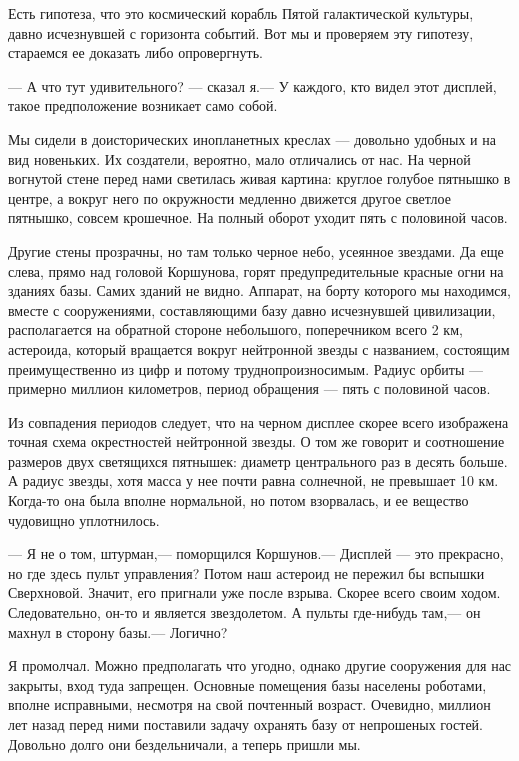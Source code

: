 \documentclass[11pt,a4paper,oneside]{article}
\begin{document}
Есть гипотеза, что это космический корабль Пятой галактической культуры, давно исчезнувшей с горизонта событий. Вот мы и проверяем эту гипотезу, стараемся ее доказать либо опровергнуть.

— А что тут удивительного? — сказал я.— У каждого, кто видел этот дисплей, такое предположение возникает само собой.

Мы сидели в доисторических инопланетных креслах — довольно удобных и на вид новеньких. Их создатели, вероятно, мало отличались от нас. На черной вогнутой стене перед нами светилась живая картина: круглое голубое пятнышко в центре, а вокруг него по окружности медленно движется другое светлое пятнышко, совсем крошечное. На полный оборот уходит пять с половиной часов.

Другие стены прозрачны, но там только черное небо, усеянное звездами. Да еще слева, прямо над головой Коршунова, горят предупредительные красные огни на зданиях базы. Самих зданий не видно. Аппарат, на борту которого мы находимся, вместе с сооружениями, составляющими базу давно исчезнувшей цивилизации, располагается на обратной стороне небольшого, поперечником всего 2 км, астероида, который вращается вокруг нейтронной звезды с названием, состоящим преимущественно из цифр и потому труднопроизносимым. Радиус орбиты — примерно миллион километров, период обращения — пять с половиной часов.

Из совпадения периодов следует, что на черном дисплее скорее всего изображена точная схема окрестностей нейтронной звезды. О том же говорит и соотношение размеров двух светящихся пятнышек: диаметр центрального раз в десять больше. А радиус звезды, хотя масса у нее почти равна солнечной, не превышает 10 км. Когда-то она была вполне нормальной, но потом взорвалась, и ее вещество чудовищно уплотнилось.

— Я не о том, штурман,— поморщился Коршунов.— Дисплей — это прекрасно, но где здесь пульт управления? Потом наш астероид не пережил бы вспышки Сверхновой. Значит, его пригнали уже после взрыва. Скорее всего своим ходом. Следовательно, он-то и является звездолетом. А пульты где-нибудь там,— он махнул в сторону базы.— Логично?

Я промолчал. Можно предполагать что угодно, однако другие сооружения для нас закрыты, вход туда запрещен. Основные помещения базы населены роботами, вполне исправными, несмотря на свой почтенный возраст. Очевидно, миллион лет назад перед ними поставили задачу охранять базу от непрошеных гостей. Довольно долго они бездельничали, а теперь пришли мы.
\end{document}
